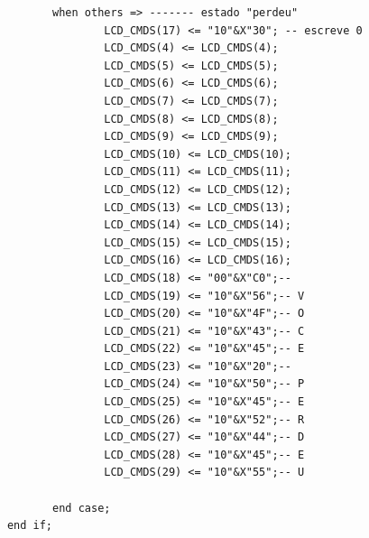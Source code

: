 \documentclass[a4paper,12pt,twoside]{article}
\begin{document}
\begin{lstlisting}
                   when others => ------- estado "perdeu"
                           LCD_CMDS(17) <= "10"&X"30"; -- escreve 0
                           LCD_CMDS(4) <= LCD_CMDS(4);  
                           LCD_CMDS(5) <= LCD_CMDS(5);  
                           LCD_CMDS(6) <= LCD_CMDS(6); 	
                           LCD_CMDS(7) <= LCD_CMDS(7);  
                           LCD_CMDS(8) <= LCD_CMDS(8);  
                           LCD_CMDS(9) <= LCD_CMDS(9);  
                           LCD_CMDS(10) <= LCD_CMDS(10);  
                           LCD_CMDS(11) <= LCD_CMDS(11); 
                           LCD_CMDS(12) <= LCD_CMDS(12); 
                           LCD_CMDS(13) <= LCD_CMDS(13); 
                           LCD_CMDS(14) <= LCD_CMDS(14); 
                           LCD_CMDS(15) <= LCD_CMDS(15); 
                           LCD_CMDS(16) <= LCD_CMDS(16); 
                           LCD_CMDS(18) <= "00"&X"C0";-- 
                           LCD_CMDS(19) <= "10"&X"56";-- V
                           LCD_CMDS(20) <= "10"&X"4F";-- O
                           LCD_CMDS(21) <= "10"&X"43";-- C
                           LCD_CMDS(22) <= "10"&X"45";-- E
                           LCD_CMDS(23) <= "10"&X"20";-- 
                           LCD_CMDS(24) <= "10"&X"50";-- P
                           LCD_CMDS(25) <= "10"&X"45";-- E 
                           LCD_CMDS(26) <= "10"&X"52";-- R
                           LCD_CMDS(27) <= "10"&X"44";-- D
                           LCD_CMDS(28) <= "10"&X"45";-- E
                           LCD_CMDS(29) <= "10"&X"55";-- U
    				
                   end case;
            end if;


\end{lstlisting}
\end{document}
